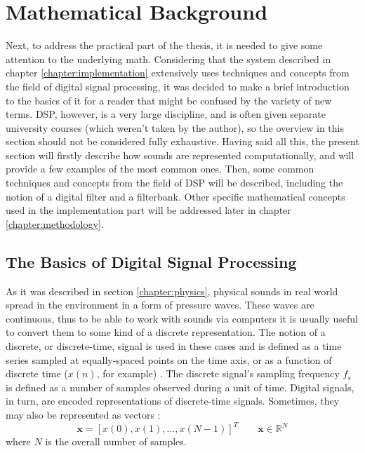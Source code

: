 \section{Mathematical Background}\label{chapter:math}

Next, to address the practical part of the thesis, it is needed to give some attention to the underlying math. Considering that the system described in chapter \ref{chapter:implementation} extensively uses techniques and concepts from the field of digital signal processing, it was decided to make a brief introduction to the basics of it for a reader that might be confused by the variety of new terms. DSP, however, is a very large discipline, and is often given separate university courses (which weren't taken by the author), so the overview in this section should not be considered fully exhaustive. Having said all this, the present section will firstly describe how sounds are represented computationally, and will provide a few examples of the most common ones. Then, some common techniques and concepts from the field of DSP will be described, including the notion of a digital filter and a filterbank. Other specific mathematical concepts used in the implementation part will be addressed later in chapter \ref{chapter:methodology}.

\subsection{The Basics of Digital Signal Processing}\label{section:math_basics}

As it was described in section \ref{chapter:physics}, physical sounds in real world spread in the environment in a form of pressure waves. These waves are continuous, thus to be able to work with sounds via computers it is usually useful to convert them to some kind of a discrete representation. The notion of a discrete, or discrete-time, signal is used in these cases and is defined as a time series sampled at equally-spaced points on the time axis, or as a function of discrete time ($x(n)$, for example) \cite{Shenoi2005}. The discrete signal's sampling frequency $f_s$ is defined as a number of samples observed during a unit of time. Digital signals, in turn, are encoded representations of discrete-time signals. Sometimes, they may also be represented as vectors \cite{Abood2020}: \begin{equation}
	\textbf{x} = [x(0), x(1), \dots{}, x(N - 1)]^T\qquad\textbf{x}\in\mathbb{R}^N
\end{equation}
where $N$ is the overall number of samples.\\

